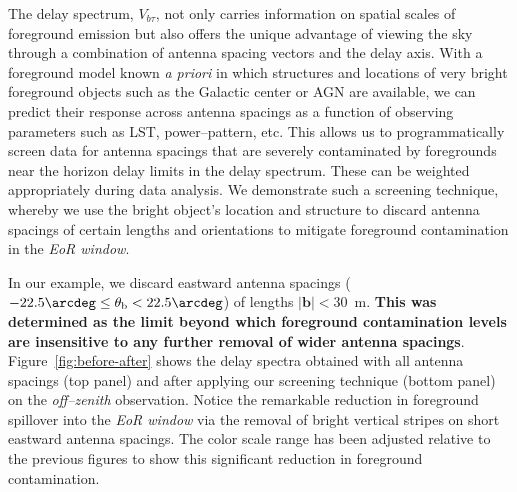 \documentclass[preprint2,iop,numberedappendix]{emulateapj}
\begin{document}
\begin{figure}[htb]
\label{fig:breakup}
\end{figure}

The delay spectrum, $V_{b\tau}$, not only carries information on spatial scales of foreground emission but also offers the unique advantage of viewing the sky through a combination of antenna spacing vectors and the delay axis. With a foreground model known {\it a priori} in which structures and locations of very bright foreground objects such as the Galactic center or AGN are available, we can predict their response across antenna spacings as a function of observing parameters such as LST, power--pattern, etc. This allows us to programmatically screen data for antenna spacings that are severely contaminated by foregrounds near the horizon delay limits in the delay spectrum. These can be weighted appropriately during data analysis. We demonstrate such a screening technique, whereby we use the bright object's location and structure to discard antenna spacings of certain lengths and orientations to mitigate foreground contamination in the {\it EoR window}. 

In our example, we discard eastward antenna spacings ($-22.5\arcdeg\le\theta_\textrm{b}< 22.5\arcdeg$) of lengths $|\boldsymbol{b}| < 30$~m. {\bf This was determined as the limit beyond which foreground contamination levels are insensitive to any further removal of wider antenna spacings}. Figure~\ref{fig:before-after} shows the delay spectra obtained with all antenna spacings (top panel) and after applying our screening technique (bottom panel) on the {\it off--zenith} observation. Notice the remarkable reduction in foreground spillover into the {\it EoR window} via the removal of bright vertical stripes on short eastward antenna spacings. The color scale range has been adjusted relative to the previous figures to show this significant reduction in foreground contamination. 
\end{document}
